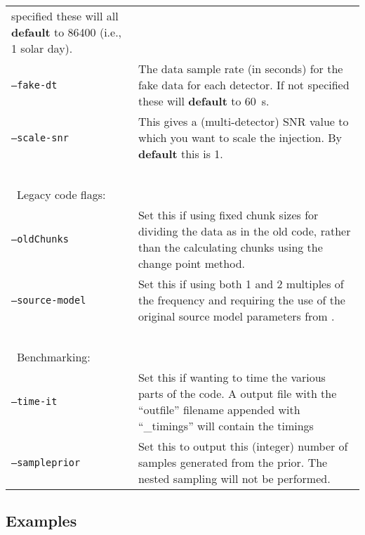 \begin{footnotesize}
\begin{longtable}{|p{}p{}|}
                            specified these will all {\bf default} to 86400 (i.e., 1 solar day). \\
 {\tt --fake-dt}         &  The data sample rate (in seconds) for the fake data for each detector. If not specified these will
                            {\bf default} to 60~s. \\
 {\tt --scale-snr}       &  This gives a (multi-detector) SNR value to which you want to scale the injection. By {\bf default} this is 1. \\
 ~ & ~ \\
\multicolumn{2}{|l|}{~Legacy code flags:} \\
 {\tt --oldChunks}       &  Set this if using fixed chunk sizes for dividing the data as in the old code, rather than the
                            calculating chunks using the change point method. \\
 {\tt --source-model}    &  Set this if using both 1 and 2 multiples of the frequency and requiring the use of the original source
                            model parameters from \citet{2015MNRAS.453.4399P}. \\
 ~ & ~ \\
\multicolumn{2}{|l|}{~Benchmarking:} \\
 {\tt --time-it}         &  Set this if wanting to time the various parts of the code. A output file with the ``outfile'' filename
                            appended with ``\_timings'' will contain the timings \\
 {\tt --sampleprior}     &  Set this to output this (integer) number of samples generated from the prior. The nested sampling will not
                            be performed. \\
\hline
\end{longtable}
\end{footnotesize}

\subsection{Examples}\label{app:examples}

